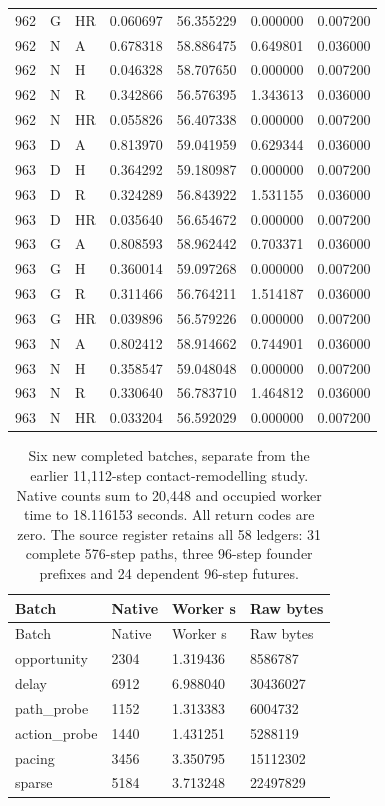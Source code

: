 \begin{longtable}{lllllll}
962 & G & HR & 0.060697 & 56.355229 & 0.000000 & 0.007200\\
962 & N & A & 0.678318 & 58.886475 & 0.649801 & 0.036000\\
962 & N & H & 0.046328 & 58.707650 & 0.000000 & 0.007200\\
962 & N & R & 0.342866 & 56.576395 & 1.343613 & 0.036000\\
962 & N & HR & 0.055826 & 56.407338 & 0.000000 & 0.007200\\
963 & D & A & 0.813970 & 59.041959 & 0.629344 & 0.036000\\
963 & D & H & 0.364292 & 59.180987 & 0.000000 & 0.007200\\
963 & D & R & 0.324289 & 56.843922 & 1.531155 & 0.036000\\
963 & D & HR & 0.035640 & 56.654672 & 0.000000 & 0.007200\\
963 & G & A & 0.808593 & 58.962442 & 0.703371 & 0.036000\\
963 & G & H & 0.360014 & 59.097268 & 0.000000 & 0.007200\\
963 & G & R & 0.311466 & 56.764211 & 1.514187 & 0.036000\\
963 & G & HR & 0.039896 & 56.579226 & 0.000000 & 0.007200\\
963 & N & A & 0.802412 & 58.914662 & 0.744901 & 0.036000\\
963 & N & H & 0.358547 & 59.048048 & 0.000000 & 0.007200\\
963 & N & R & 0.330640 & 56.783710 & 1.464812 & 0.036000\\
963 & N & HR & 0.033204 & 56.592029 & 0.000000 & 0.007200\\
\bottomrule
\end{longtable}
\endgroup

\begingroup\scriptsize\setlength{\tabcolsep}{3pt}
\begin{longtable}{llll}
\caption{Six new completed batches, separate from the earlier 11,112-step contact-remodelling study. Native counts sum to 20,448 and occupied worker time to 18.116153 seconds. All return codes are zero. The source register retains all 58 ledgers: 31 complete 576-step paths, three 96-step founder prefixes and 24 dependent 96-step futures.}\label{tab:reach-jobs}\\
\toprule
Batch & Native & Worker s & Raw bytes\\
\midrule\endfirsthead
\toprule
Batch & Native & Worker s & Raw bytes\\
\midrule\endhead
opportunity & 2304 & 1.319436 & 8586787\\
delay & 6912 & 6.988040 & 30436027\\
path\_probe & 1152 & 1.313383 & 6004732\\
action\_probe & 1440 & 1.431251 & 5288119\\
pacing & 3456 & 3.350795 & 15112302\\
sparse & 5184 & 3.713248 & 22497829\\
\bottomrule
\end{longtable}
\endgroup
